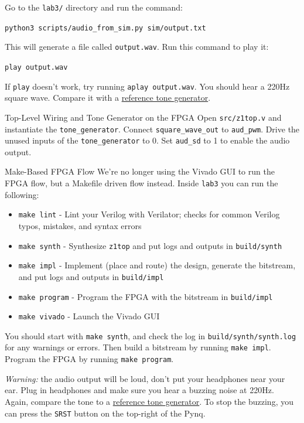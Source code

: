 \documentclass[11pt]{article}
\makeatletter
\renewcommand{\section}
{\@startsection {section}{1}{0pt}
 {-2ex}
 {1ex}
 {\bfseries\Large}}
\renewcommand{\subsection}
{\@startsection {subsection}{1}{0pt}
 {-1ex}
 {0.5ex}
 {\bfseries\normalsize}}
\makeatother
\begin{document}
Go to the \verb|lab3/| directory and run the command:

\verb|python3 scripts/audio_from_sim.py sim/output.txt|

This will generate a file called \verb|output.wav|. Run this command to play it:

\verb|play output.wav|

If \verb|play| doesn't work, try running \verb|aplay output.wav|.
You should hear a 220Hz square wave. Compare it with a \href{https://www.szynalski.com/tone-generator/}{reference tone generator}.

\section{Top-Level Wiring and Tone Generator on the FPGA}
Open \verb|src/z1top.v| and instantiate the \verb|tone_generator|.
Connect \verb|square_wave_out| to \verb|aud_pwm|.
Drive the unused inputs of the \verb|tone_generator| to 0.
Set \verb|aud_sd| to 1 to enable the audio output.

\subsection{Make-Based FPGA Flow}
We're no longer using the Vivado GUI to run the FPGA flow, but a Makefile driven flow instead.
Inside \verb|lab3| you can run the following:
\begin{itemize}
  \item \verb|make lint| - Lint your Verilog with Verilator; checks for common Verilog typos, mistakes, and syntax errors
  \item \verb|make synth| - Synthesize \verb|z1top| and put logs and outputs in \verb|build/synth|
  \item \verb|make impl| - Implement (place and route) the design, generate the bitstream, and put logs and outputs in \verb|build/impl|
  \item \verb|make program| - Program the FPGA with the bitstream in \verb|build/impl|
  \item \verb|make vivado| - Launch the Vivado GUI
\end{itemize}

You should start with \verb|make synth|, and check the log in \texttt{build/synth/synth.log} for any warnings or errors.
Then build a bitstream by running \verb|make impl|.
Program the FPGA by running \texttt{make program}.

\textit{Warning:} the audio output will be loud, don't put your headphones near your ear.
Plug in headphones and make sure you hear a buzzing noise at 220Hz.
Again, compare the tone to a \href{https://www.szynalski.com/tone-generator/}{reference tone generator}.
To stop the buzzing, you can press the \verb|SRST| button on the top-right of the Pynq.
\end{document}
